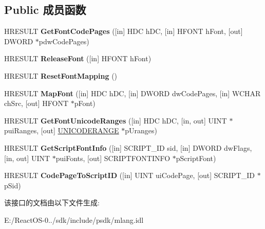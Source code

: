 \subsection*{Public 成员函数}
\begin{DoxyCompactItemize}
\item 
\mbox{\label{interface_multi_language_1_1_i_m_lang_font_link2_a9fbbefab61670add655673b76bccc21b}} 
H\+R\+E\+S\+U\+LT {\bfseries Get\+Font\+Code\+Pages} (\mbox{[}in\mbox{]} H\+DC h\+DC, \mbox{[}in\mbox{]} H\+F\+O\+NT h\+Font, \mbox{[}out\mbox{]} D\+W\+O\+RD $\ast$pdw\+Code\+Pages)
\item 
\mbox{\label{interface_multi_language_1_1_i_m_lang_font_link2_afcbc4e76ae7176502ed5e5545743f66a}} 
H\+R\+E\+S\+U\+LT {\bfseries Release\+Font} (\mbox{[}in\mbox{]} H\+F\+O\+NT h\+Font)
\item 
\mbox{\label{interface_multi_language_1_1_i_m_lang_font_link2_af06819a9facad5d09ec1ede8dd3d30dc}} 
H\+R\+E\+S\+U\+LT {\bfseries Reset\+Font\+Mapping} ()
\item 
\mbox{\label{interface_multi_language_1_1_i_m_lang_font_link2_a7fa8b31d553c1ec6ee1504a1044a9773}} 
H\+R\+E\+S\+U\+LT {\bfseries Map\+Font} (\mbox{[}in\mbox{]} H\+DC h\+DC, \mbox{[}in\mbox{]} D\+W\+O\+RD dw\+Code\+Pages, \mbox{[}in\mbox{]} W\+C\+H\+AR ch\+Src, \mbox{[}out\mbox{]} H\+F\+O\+NT $\ast$p\+Font)
\item 
\mbox{\label{interface_multi_language_1_1_i_m_lang_font_link2_a4267a099ec8214683fdbe7a6367bd0bb}} 
H\+R\+E\+S\+U\+LT {\bfseries Get\+Font\+Unicode\+Ranges} (\mbox{[}in\mbox{]} H\+DC h\+DC, \mbox{[}in, out\mbox{]} U\+I\+NT $\ast$pui\+Ranges, \mbox{[}out\mbox{]} \hyperlink{struct_multi_language_1_1_i_m_lang_font_link2_1_1tag_u_n_i_c_o_d_e_r_a_n_g_e}{U\+N\+I\+C\+O\+D\+E\+R\+A\+N\+GE} $\ast$p\+Uranges)
\item 
\mbox{\label{interface_multi_language_1_1_i_m_lang_font_link2_ad68910644929654aa6bf6f7013ff431a}} 
H\+R\+E\+S\+U\+LT {\bfseries Get\+Script\+Font\+Info} (\mbox{[}in\mbox{]} S\+C\+R\+I\+P\+T\+\_\+\+ID sid, \mbox{[}in\mbox{]} D\+W\+O\+RD dw\+Flags, \mbox{[}in, out\mbox{]} U\+I\+NT $\ast$pui\+Fonts, \mbox{[}out\mbox{]} S\+C\+R\+I\+P\+T\+F\+O\+N\+T\+I\+N\+FO $\ast$p\+Script\+Font)
\item 
\mbox{\label{interface_multi_language_1_1_i_m_lang_font_link2_aba91066b847758bfa68282110b06ba88}} 
H\+R\+E\+S\+U\+LT {\bfseries Code\+Page\+To\+Script\+ID} (\mbox{[}in\mbox{]} U\+I\+NT ui\+Code\+Page, \mbox{[}out\mbox{]} S\+C\+R\+I\+P\+T\+\_\+\+ID $\ast$p\+Sid)
\end{DoxyCompactItemize}


该接口的文档由以下文件生成\+:\begin{DoxyCompactItemize}
\item 
E\+:/\+React\+O\+S-\/0../sdk/include/psdk/mlang.\+idl\end{DoxyCompactItemize}
